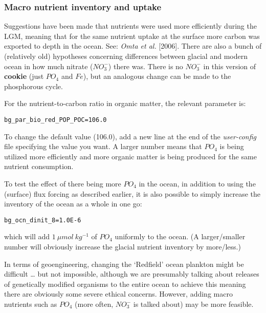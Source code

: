 
\subsubsection*{Macro nutrient inventory and uptake}

\vspace{2mm}
Suggestions have been made that nutrients were used more efficiently during the LGM, meaning that for the same nutrient uptake at the surface more carbon was exported to depth in the ocean. See: \textit{Omta et al.} [2006]. There are also a bunch of (relatively old) hypotheses concerning differences between glacial and modern ocean in how much nitrate (\(NO^{-}_{3}\)) there was. There is no \(NO^{-}_{3}\) in this version of \textbf{cookie} (just \(PO_{4}\) and \(Fe\)), but an analogous change can be made to the phosphorous cycle.

For the nutrient-to-carbon ratio in organic matter, the relevant parameter is:
\vspace{-1mm}\small\begin{verbatim}
bg_par_bio_red_POP_POC=106.0
\end{verbatim}\normalsize\vspace{-1mm}

\noindent To change the default value (106.0), add a new line at the end of the \textit{user-config} file specifying the value you want. A larger number means that \(PO_{4}\) is being utilized more efficiently and more organic matter is being produced for the same nutrient consumption.

To test the effect of there being more \(PO_{4}\) in the ocean, in addition to using the (surface) flux forcing as described earlier, it is also possible to simply increase the inventory of the ocean as a whole in one go:
\vspace{-1mm}\small\begin{verbatim}
bg_ocn_dinit_8=1.0E-6
\end{verbatim}\normalsize\vspace{-1mm}
which will add \(1\:\mu mol\:kg^{-1}\) of \(PO_{4}\) uniformly to the ocean. (A larger/smaller number will obviously increase the glacial nutrient inventory by more/less.)

In terms of geoengineering, changing the ‘Redfield’ ocean plankton might be difficult … but not impossible, although we are presumably talking about releases of genetically modified organisms to the entire ocean to achieve this meaning there are obviously some severe ethical concerns. However, adding macro nutrients such as \(PO_{4}\) (more often, \(NO^{-}_{3}\) is talked about) may be more feasible.

